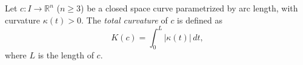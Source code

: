 Let $c: I \to \mathbb{R}^n$ ($n \geq 3$) be a closed space curve parametrized by arc length, with curvature $\kappa(t) > 0$. The \emph{total curvature} of $c$ is defined as
$$K(c) = \int_0^L |\kappa(t)|\,dt,$$
where $L$ is the length of $c$.
